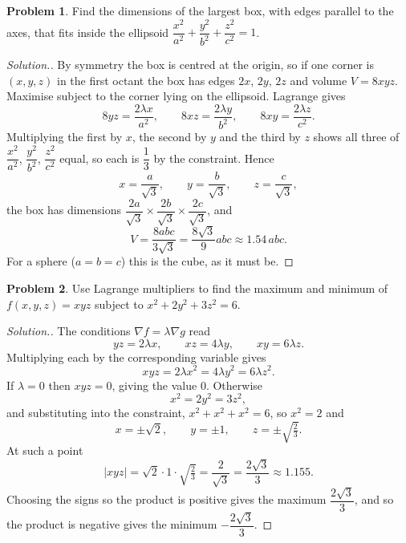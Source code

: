 \documentclass[11pt,a4paper]{article}
\theoremstyle{definition}
\newtheorem{problemx}{Problem}[subsection]
\newenvironment{problem}{\begin{problemx}}{\end{problemx}}
\newenvironment{solution}
  {\renewcommand{\qedsymbol}{}\begin{proof}[\textit{Solution}.]}
  {\end{proof}}
\begin{document}
\begin{problem}
Find the dimensions of the largest box, with edges parallel to the axes, that
fits inside the ellipsoid
$\dfrac{x^2}{a^2}+\dfrac{y^2}{b^2}+\dfrac{z^2}{c^2} = 1$.
\end{problem}
\begin{solution}
By symmetry the box is centred at the origin, so if one corner is $(x,y,z)$ in
the first octant the box has edges $2x$, $2y$, $2z$ and volume $V = 8xyz$.
Maximise subject to the corner lying on the ellipsoid. Lagrange gives
\[8yz = \frac{2\lambda x}{a^2},\qquad 8xz = \frac{2\lambda y}{b^2},
\qquad 8xy = \frac{2\lambda z}{c^2}.\]
Multiplying the first by $x$, the second by $y$ and the third by $z$ shows all
three of $\dfrac{x^2}{a^2}$, $\dfrac{y^2}{b^2}$, $\dfrac{z^2}{c^2}$ equal, so
each is $\dfrac13$ by the constraint. Hence
\[x = \frac{a}{\sqrt3},\qquad y = \frac{b}{\sqrt3},\qquad z = \frac{c}{\sqrt3},\]
the box has dimensions $\dfrac{2a}{\sqrt3}\times\dfrac{2b}{\sqrt3}\times
\dfrac{2c}{\sqrt3}$, and
\[V = \frac{8abc}{3\sqrt3} = \frac{8\sqrt3}{9}abc\approx 1.54\,abc .\]
For a sphere ($a=b=c$) this is the cube, as it must be.
\end{solution}

\begin{problem}
Use Lagrange multipliers to find the maximum and minimum of $f(x,y,z) = xyz$
subject to $x^2+2y^2+3z^2 = 6$.
\end{problem}
\begin{solution}
The conditions $\nabla f = \lambda\nabla g$ read
\[yz = 2\lambda x,\qquad xz = 4\lambda y,\qquad xy = 6\lambda z .\]
Multiplying each by the corresponding variable gives
\[xyz = 2\lambda x^2 = 4\lambda y^2 = 6\lambda z^2 .\]
If $\lambda = 0$ then $xyz = 0$, giving the value $0$. Otherwise
\[x^2 = 2y^2 = 3z^2 ,\]
and substituting into the constraint, $x^2+x^2+x^2 = 6$, so $x^2 = 2$ and
\[x = \pm\sqrt2,\qquad y = \pm 1,\qquad z = \pm\sqrt{\tfrac23}.\]
At such a point
\[\left|xyz\right| = \sqrt2\cdot 1\cdot\sqrt{\tfrac23} = \frac{2}{\sqrt3}
= \frac{2\sqrt3}{3}\approx 1.155 .\]
Choosing the signs so the product is positive gives the maximum
$\dfrac{2\sqrt3}{3}$, and so the product is negative gives the minimum
$-\dfrac{2\sqrt3}{3}$.
\end{solution}
\end{document}
